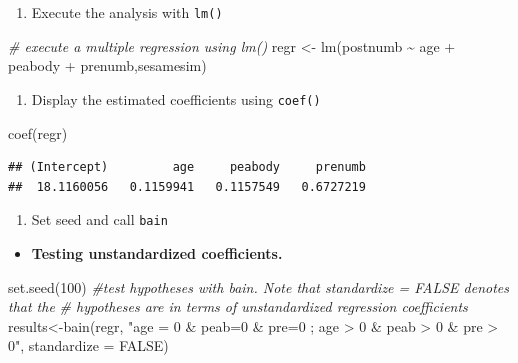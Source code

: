 \documentclass[
]{book}
\newenvironment{Shaded}{\begin{snugshade}}{\end{snugshade}}
\newcommand{\AttributeTok}[1]{\textcolor[rgb]{0.77,0.63,0.00}{#1}}
\newcommand{\CommentTok}[1]{\textcolor[rgb]{0.56,0.35,0.01}{\textit{#1}}}
\newcommand{\ConstantTok}[1]{\textcolor[rgb]{0.00,0.00,0.00}{#1}}
\newcommand{\DecValTok}[1]{\textcolor[rgb]{0.00,0.00,0.81}{#1}}
\newcommand{\FunctionTok}[1]{\textcolor[rgb]{0.00,0.00,0.00}{#1}}
\newcommand{\NormalTok}[1]{#1}
\newcommand{\OtherTok}[1]{\textcolor[rgb]{0.56,0.35,0.01}{#1}}
\newcommand{\SpecialCharTok}[1]{\textcolor[rgb]{0.00,0.00,0.00}{#1}}
\newcommand{\StringTok}[1]{\textcolor[rgb]{0.31,0.60,0.02}{#1}}
\providecommand{\tightlist}{%
  \setlength{\itemsep}{0pt}\setlength{\parskip}{0pt}}
\begin{document}
\begin{enumerate}
\def\labelenumi{\arabic{enumi})}
\tightlist
\item
  Execute the analysis with \texttt{lm()}
\end{enumerate}

\begin{Shaded}
\begin{Highlighting}[]
\CommentTok{\# execute a multiple regression using lm()}
\NormalTok{regr }\OtherTok{\textless{}{-}} \FunctionTok{lm}\NormalTok{(postnumb }\SpecialCharTok{\textasciitilde{}}\NormalTok{ age }\SpecialCharTok{+}\NormalTok{ peabody }\SpecialCharTok{+}\NormalTok{ prenumb,sesamesim)}
\end{Highlighting}
\end{Shaded}

\begin{enumerate}
\def\labelenumi{\arabic{enumi})}
\setcounter{enumi}{1}
\tightlist
\item
  Display the estimated coefficients using \texttt{coef()}
\end{enumerate}

\begin{Shaded}
\begin{Highlighting}[]
\FunctionTok{coef}\NormalTok{(regr)}
\end{Highlighting}
\end{Shaded}

\begin{verbatim}
## (Intercept)         age     peabody     prenumb 
##  18.1160056   0.1159941   0.1157549   0.6727219
\end{verbatim}

\begin{enumerate}
\def\labelenumi{\arabic{enumi})}
\setcounter{enumi}{2}
\tightlist
\item
  Set seed and call \texttt{bain}
\end{enumerate}

\begin{itemize}
\tightlist
\item
  \textbf{Testing unstandardized coefficients.}
\end{itemize}

\begin{Shaded}
\begin{Highlighting}[]
\FunctionTok{set.seed}\NormalTok{(}\DecValTok{100}\NormalTok{)}
\CommentTok{\#test hypotheses with bain. Note that standardize = FALSE denotes that the}
\CommentTok{\# hypotheses are in terms of unstandardized regression coefficients}
\NormalTok{results}\OtherTok{\textless{}{-}}\FunctionTok{bain}\NormalTok{(regr, }\StringTok{"age = 0 \& peab=0 \& pre=0 ; age \textgreater{} 0 \& peab \textgreater{} 0 \& pre \textgreater{} 0"}\NormalTok{,}
              \AttributeTok{standardize =} \ConstantTok{FALSE}\NormalTok{)}
\end{Highlighting}
\end{Shaded}
\end{document}
